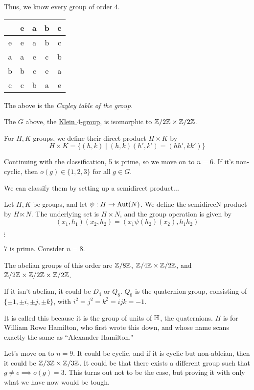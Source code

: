 \documentclass[x11names,reqno,14pt]{extarticle}
\begin{document}
Thus, we know every group of order $4$. 

\begin{center}
\begin{tabular}{c | c c c c }
 & e & a & b & c \\
\hline
e & e & a & b & c \\
a & a & e & c & b \\
b & b & c & e & a \\
c & c & b & a & e \\
\end{tabular}
\end{center}
The above is the \it{Cayley table} of the group. 

\claim The $G$ above, the \underline{Klein $4$-group}, is isomorphic to $\mathbb{Z}/2\mathbb{Z} \times \mathbb{Z}/2\mathbb{Z}$. 


For $H, K$ groups, we define their direct product $H\times K$ by 
\[
H\times K = \{(h, k) \mid (h,k)(h',k') = (hh', kk')\}
\] 

Continuing with the classification, 5 is prime, so we move on to $n = 6$. If it's non-cyclic, then $o(g) \in \{1, 2, 3\}$ for all $g \in G$. 

We can classify them by setting up a semidirect product...

Let $H, K$ be groups, and let $\psi:H\to{\mathrm{Aut}}(N)$. We define the semidirecN product by $H\ltimes N$. The underlying set is $H\times N$, and the group operation is given by 
\[
(x_1,h_1)(x_2,h_2) = (x_1\psi(h_2)(x_2),h_1h_2)
\]




$\vdots$ 

7 is prime. Consider $n = 8$. 

The abelian groups of this order are $\mathbb{Z}/8\mathbb{Z}$, $\mathbb{Z}/4\mathbb{Z}\times\mathbb{Z}/2\mathbb{Z}$, and $\mathbb{Z}/2\mathbb{Z}\times\mathbb{Z}/2\mathbb{Z}\times\mathbb{Z}/2\mathbb{Z}$.  

If it isn't abelian, it could be $D_4$ or $Q_8$. $Q_8$ is the quaternion group, consisting of $\{\pm 1, \pm i, \pm j, \pm k\}$, with $i^2 = j^2 = k^2 = ijk = -1$. 

It is called this because it is the group of units of ${\mathbb{H}}$, the quaternions. $H$ is for William Rowe Hamilton, who first wrote this down, and whose name scans exactly the same as ``Alexander Hamilton." 

Let's move on to $n = 9$. It could be cyclic, and if it is cyclic but non-ableian, then it could be $\mathbb{Z}/3\mathbb{Z}\times\mathbb{Z}/3\mathbb{Z}$. It could be that there exists a different group such that $g\neq e \implies o(g) = 3$. This turns out not to be the case, but proving it with only what we have now would be tough. 
\end{document}
